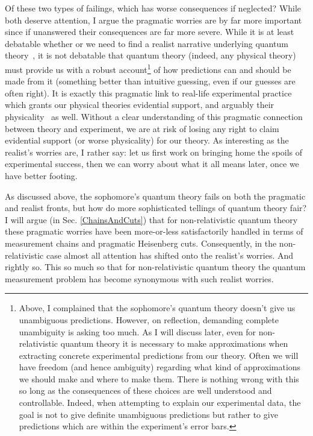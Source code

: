 \documentclass[prd,twocolumn,superscriptaddress,floatfix,amsmath,amssymb,amsfonts,nofootinbib]{revtex4-2}
\begin{document}
Of these two types of failings, which has worse consequences if neglected? While both deserve attention, I argue the pragmatic worries are by far more important since if unanswered their consequences are far more severe. While it is at least debatable whether or we need to find a realist narrative underlying quantum theory~\cite{sep-qt-issues}, it is not debatable that quantum theory (indeed, any physical theory) must provide us with a robust account\footnote{Above, I complained that the sophomore's quantum theory doesn't give us unambiguous predictions. However, on reflection, demanding complete unambiguity is asking too much. As I will discuss later, even for non-relativistic quantum theory it is necessary to make approximations when extracting concrete experimental predictions from our theory. Often we will have freedom (and hence ambiguity) regarding what kind of approximations we should make and where to make them. There is nothing wrong with this so long as the consequences of these choices are well understood and controllable. Indeed, when attempting to explain our experimental data, the goal is not to give definite unambiguous predictions but rather to give predictions which are within the experiment's error bars.} of how predictions can and should be made from it (something better than intuitive guessing, even if our guesses are often right). It is exactly this pragmatic link to real-life experimental practice which grants our physical theories evidential support, and arguably their physicality~\cite{Curiel} as well. Without a clear understanding of this pragmatic connection between theory and experiment, we are at risk of losing any right to claim evidential support (or worse physicality) for our theory. As interesting as the realist's worries are, I rather say: let us first work on bringing home the spoils of experimental success, then we can worry about what it all means later, once we have better footing.

As discussed above, the sophomore's quantum theory fails on both the pragmatic and realist fronts, but how do more sophisticated tellings of quantum theory fair? I will argue (in Sec. \ref{ChainsAndCuts}) that for non-relativistic quantum theory these pragmatic worries have been more-or-less satisfactorily handled in terms of measurement chains and pragmatic Heisenberg cuts. Consequently, in the non-relativistic case almost all attention has shifted onto the realist's worries. And rightly so. This so much so that for non-relativistic quantum theory the quantum measurement problem has become synonymous with such realist worries.
\end{document}
